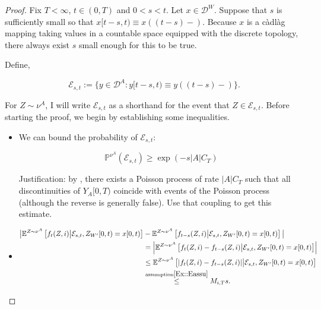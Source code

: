 \documentclass[12pt]{article}
\newcommand{\mb}{\mathbb}
\newcommand{\mc}{\mathcal}
\newcommand{\os}{\overset}
\newcommand{\te}{\text}
\newcommand{\ind}{\hspace{24pt}}
\newcommand{\pr}{\mb{P}}							%
\newcommand{\exmu}[2]{\mb{E}^{#1}\left[#2\right]}	%
\newcommand{\defeq}{:=}								%
\newcommand{\cad}{\mc{D}}							%
\newcommand{\xf}{x}									%
\newcommand{\xg}{y}									%
\newcommand{\vind}[1]{_{#1}}						%
\newcommand{\tme}[1]{(#1)}							%
\newcommand{\tmi}[1]{#1}							%
\newcommand{\vpara}[1]{^{#1}}						%
\newcommand{\tpara}[1]{_{#1}}						%
\newcommand{\jumpbd}[1]{C_{#1}}						%
\newcommand{\evnt}{\mc{E}}						%
\newcommand{\Xg}{Y}									%
\newcommand{\mm}{\nu}								%
\newcommand{\const}{M}								%
\newcommand{\sttpara}[2]{_{#1,#2}}					%
\newcommand{\mpara}[1]{^{#1}}						%
\newcommand{\tspara}[2]{_{#1,#2}}					%
\newcommand{\Xh}{Z}									%
\begin{document}
\begin{proof}
Fix \(T < \infty\), \(t \in (0,T)\) and \(0 < s < t\). Let \(x \in \cad\vpara{W}\). Suppose that \(s\) is sufficiently small so that \(\xf\tmi{[t-s,t)} \equiv \xf\tme{(t-s)-}\). Because \(\xf\) is a c\`adl\`ag mapping taking values in a countable space equipped with the discrete topology, there always exist \(s\) small enough for this to be true.

\ind Define,

\[\evnt\tspara{s}{t} \defeq \{\xg \in \cad\vpara{A}: \xg\tmi{[t-s,t)} \equiv \xg\tme{(t-s)-}\}.\]

For \(Z \sim \mm\vpara{A}\), I will write \(\evnt\tspara{s}{t}\) as a shorthand for the event that \(Z \in \evnt\tspara{s}{t}\). Before starting the proof, we begin by establishing some inequalities.

\begin{itemize}
\item We can bound the probability of \(\evnt\tspara{s}{t}\):

\begin{equation}
\pr\mpara{\mm\vpara{A}}(\evnt\tspara{s}{t}) \geq \exp\left(-s|A|\jumpbd{T}\right)
\label{Ex::evntbd}
\end{equation}

Justification: by \cite[Exercise 14.7.I]{DalVer08}, there exists a Poisson process of rate \(|A|\jumpbd{T}\) such that all discontinuities of \(\Xg\vind{A}\tmi{[0,T)}\) coincide with events of the Poisson process (although the reverse is generally false). Use that coupling to get this estimate.

\item 

\begin{align}
\big|\exmu{\Xh \sim\mm\vpara{A}}{f\tpara{t}(\Xh,i)\middle|\evnt\tspara{s}{t},\Xh\vind{W'}\tmi{[0,t)} = \xf\tmi{[0,t)}}& - \exmu{\Xh \sim\mm\vpara{A}}{f\tpara{t-s}(\Xh,i)\middle|\evnt\tspara{s}{t},\Xh\vind{W'}\tmi{[0,t)} = \xf\tmi{[0,t)}}\big|\nonumber \\
&= \left|\exmu{\Xh \sim\mm\vpara{A}}{f\tpara{t}(\Xh,i) - f\tpara{t-s}(\Xh,i)\middle|\evnt\tspara{s}{t},\Xh\vind{W'}\tmi{[0,t)} = \xf\tmi{[0,t)}}\right|\nonumber\\
& \leq \exmu{\Xh \sim\mm\vpara{A}}{|f\tpara{t}(\Xh,i) - f\tpara{t-s}(\Xh,i)|\middle|\evnt\tspara{s}{t},\Xh\vind{W'}\tmi{[0,t)} = \xf\tmi{[0,t)}}\nonumber\\
&\os{\te{assumption} \ref{Ex::Eassu}}{\leq} \const\sttpara{i}{T}s.
\label{Ex::lipft}
\end{align}


\end{itemize}
\end{proof}
\end{document}
